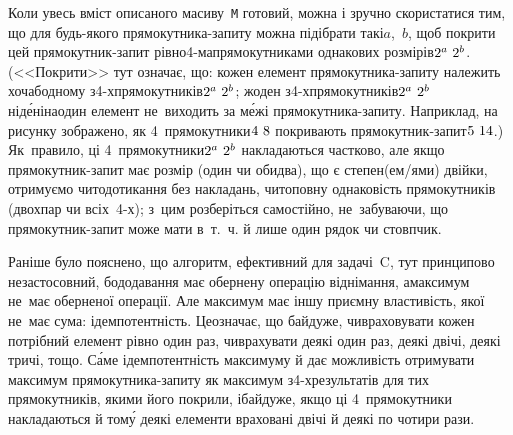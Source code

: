 Коли увесь вміст описаного масиву~\texttt{M} готовий, можна і зручно скористатися тим, що для будь-якого прямокутника-запиту можна підібрати такі\nolinebreak[3] $a$,~$b$, щоб покрити цей прямокутник-запит рівно\nolinebreak[2] \mbox{4-ма}\nolinebreak[2] прямокутниками однакових розмірів\nolinebreak[2] ${2^a\,{\*}\,2^b}$. (<<Покрити>> тут означає, що: кожен елемент прямокутника-запиту належить хоча\nolinebreak[3] б\nolinebreak[2] одному з\nolinebreak[2] \mbox{4-х}\nolinebreak[2] прямокутників\nolinebreak[2] ${2^a\,{\*}\,2^b}$; жоден з\nolinebreak[2] \mbox{4-х}\nolinebreak[2] прямокутників\nolinebreak[2] ${2^a\,{\*}\,2^b}$ нід\'{е}\nolinebreak[2] ні\nolinebreak[3] на\nolinebreak[3] один елемент не~виходить за м\'{е}жі прямокутника-запиту. Наприклад, на рисунку зображено, як 4~прямокутники\nolinebreak[2] ${4\,{\*}\,8}$ покривають прямокутник-запит\nolinebreak[2] ${5\,{\*}\,14}$.) Як~правило, ці 4~прямокутники\nolinebreak[2] ${2^a\,{\*}\,2^b}$ накладаються частково, але якщо прямокутник-запит має розмір (один чи обидва), що є степен(ем/ями) двійки, отримуємо чи\nolinebreak[3] то\nolinebreak[2] дотикання без накладань, чи\nolinebreak[3] то\nolinebreak[2] повну однаковість прямокутників (двох\nolinebreak[2] пар чи всіх~\mbox{4-х}); з~цим 
розберіться самостійно, 
не~забуваючи, що прямокутник-запит може мати 
в~т.~ч.
й лише один рядок чи стовпчик.

Раніше було пояснено, що алгоритм, ефективний для задачі~C, тут принципово незасто\-сов\-ний, бо\nolinebreak[3] додавання має обернену операцію віднімання, а\nolinebreak[3] максимум не~має оберненої операції. Але максимум має іншу приємну властивість, якої не~має сума: ідемпотентність. 
Це\nolinebreak[3] означає, що байдуже, чи\nolinebreak[3] враховувати кожен потрібний елемент рівно один раз, чи\nolinebreak[3] врахувати деякі один раз, деякі двічі, деякі тричі, тощо. 
С\'{а}ме ідемпотентність максимуму й дає можливість отримувати максимум прямокутника-запиту як максимум з\nolinebreak[3] \mbox{4-х}\nolinebreak[3] результатів для тих прямокутників, якими його покрили, і\nolinebreak[3] байдуже, якщо ці 4~прямокутники накладаються й том\'{у} деякі елементи враховані двічі й деякі по чотири рази. 

